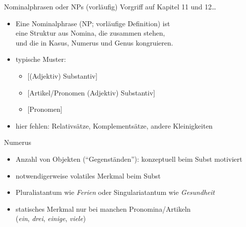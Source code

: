 \begin{frame}
  {Nominalphrasen oder NPs (vorläufig)}
  \pause
  Vorgriff auf Kapitel 11 und 12\dots\\
  \pause
  \Halbzeile
  \begin{exe}
    \ex
    \begin{xlist}
      \pause
      \pause
    \end{xlist}
  \end{exe}
  \pause
  \begin{itemize}[<+->]
    \item \alert{Eine Nominalphrase (NP; vorläufige Definition) ist\\
      eine Struktur aus Nomina, die zusammen stehen,\\
      und die in Kasus, Numerus und Genus kongruieren.}
      \Halbzeile
    \item typische Muster:
      \begin{itemize}
        \item{[(Adjektiv) Substantiv]}
        \item{[Artikel\slash Pronomen (Adjektiv) Substantiv]}
        \item{[Pronomen]}
      \end{itemize}
      \Halbzeile
    \item hier fehlen: Relativsätze, Komplementsätze, andere Kleinigkeiten
  \end{itemize}
\end{frame}

\begin{frame}
  {Numerus}
  \pause
  \begin{exe}
    \ex
    \begin{xlist}
      \pause
    \end{xlist}
    \pause
    \ex
    \begin{xlist}
      \pause
    \end{xlist}
  \end{exe}
  \pause
  \Halbzeile
  \begin{itemize}[<+->]
    \item \alert{Anzahl von Objekten ("`Gegenständen"')}: konzeptuell beim Subst motiviert
    \item notwendigerweise volatiles Merkmal beim Subst
    \item Pluraliatantum wie \textit{Ferien} oder Singulariatantum wie \textit{Gesundheit}
    \item statisches Merkmal nur bei manchen Pronomina\slash Artikeln\\
      (\textit{ein}, \textit{drei}, \textit{einige}, \textit{viele})
  \end{itemize}
\end{frame}

